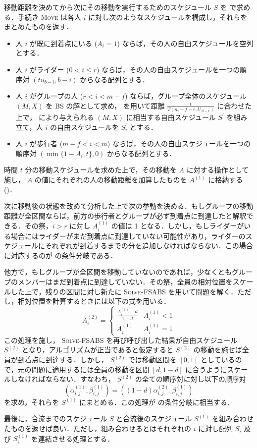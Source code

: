 移動距離を決めてから次にその移動を実行するためのスケジュール $S$ を  で求める．手続き \textsc{Move} は各人 $i$ に対し次のようなスケジュールを構成し，それらをまとめたものを返す．
\begin{itemize}
\item 人 $i$ が既に到着点にいる ($A_i = 1$) ならば，その人の自由スケジュールを空列とする．
\item 人 $i$ がライダー ($0 < i \leq r$) ならば，その人の自由スケジュールを一つの順序対 $(tu_{b-i}, b-i)$ からなる配列とする．
\item 人 $i$ がグループの人 ($r < i < m - f$) ならば，グループ全体のスケジュール $(M, X)$ を BS の解として求め，  を用いて距離 $\frac{t}{T(m - f - r, U_{:b-r})}$ に合わせた上で，  により与えられる  $(M, X)$ に相当する自由スケジュール $S^\prime$ を組み立て，人 $i$ の自由スケジュールを $S^\prime_i$ とする．
\item 人 $i$ が歩行者 ($m - f < i < m$) ならば，その人の自由スケジュールを一つの順序対 $(\min \{ 1 - A_i, t \}, 0)$ からなる配列とする．
\end{itemize}
時間 $t$ 分の移動スケジュールを求めた上で，その移動を $A$ に対する操作として施し， $A$ の値にそれぞれの人の移動距離を加算したものを $A^{(1)}$ に格納する ()．

次に移動後の状態を改めて分析した上で次の挙動を決める．もしグループの移動距離が全区間ならば，前方の歩行者とグループが必ず到着点に到達したと解釈できる．その祭，$i > r$ に対し $A^{(1)}_i$ の値は 1 となる．しかし，もしライダーがいる場合にはライダーがまだ到着点に到達していない可能性があり，ライダーのスケジュールにそれぞれが到着するまでの分を追加しなければならない．この場合に対応するのが  の条件分岐である．

他方で，もしグループが全区間を移動していないのであれば，少なくともグループのメンバーはまだ到着点に到達していない．その祭，全員の相対位置をスケールした上で，残りの区間に対し新たに \textsc{Solve-FSABS} を用いて問題を解く．ただし，相対位置を計算するときには以下の式を用いる．
\begin{equation}
  A^{(2)}_i = \begin{cases}
    \frac{A^{(1)}_i - d}{1 - d} & A^{(1)}_i < 1 \\
    A^{(1)}_i & A^{(1)}_i = 1
  \end{cases}
\end{equation}
この処理を施し， \textsc{Solve-FSABS} を再び呼び出した結果が自由スケジュール $S^{(2)}$ となり，アルゴリズムが正当であると仮定すると $S^{(2)}$ の移動を施せば全員が到着点に到達する．しかし， $S^{(2)}$ では移動区間を $[0, 1]$ としているので，元の問題に適用するには全員の移動を区間 $[d, 1 -d]$ に合うようにスケールしなければならない．すなわち， $S^{(2)}$ の全ての順序対に対し以下の順序対
\begin{equation}
  (\alpha^{(1)}_{i, j}, \beta^{(1)}_{i,j}) = ((1 - d)\alpha^{(2)}_{i,j}, \beta^{(1)}_{i,j})
\end{equation}
を求め，それらを $S^{(1)}$ にまとめる．この処理が  の条件分岐に相当する．

最後に，合流までのスケジュール $S$ と合流後のスケジュール $S^{(1)}$ を組み合わせたものを返せば良い．ただし，組み合わせるとはそれぞれの $i$ に対し配列 $S_i$ 及び $S^{(1)}_i$ を連結させる処理とする．